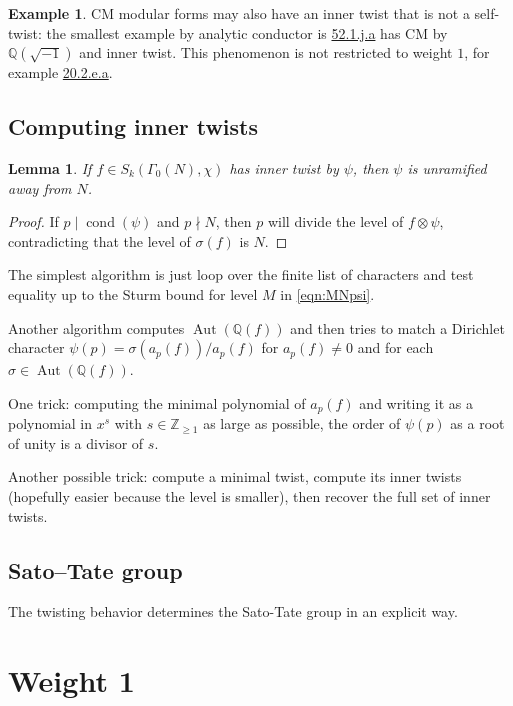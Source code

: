 \documentclass[11pt]{amsart}
\numberwithin{equation}{subsection}
\theoremstyle{plain}
\newtheorem{lem}[equation]{Lemma}
\theoremstyle{definition}
\newtheorem{exm}[equation]{Example}
\newcommand{\Q}{\mathbb{Q}}
\newcommand{\Z}{\mathbb{Z}}
\DeclareMathOperator{\Aut}{Aut}
\DeclareMathOperator{\cond}{cond}
\begin{document}
\begin{exm}
CM modular forms may also have an inner twist that is not a self-twist: the smallest example by analytic conductor is \href{http://cmfs.lmfdb.xyz/ModularForm/GL2/Q/holomorphic/52/1/j/a/}{\textsf{52.1.j.a}} has CM by $\Q(\sqrt{-1})$ and inner twist.  This phenomenon is not restricted to weight $1$, for example \href{http://cmfs.lmfdb.xyz/ModularForm/GL2/Q/holomorphic/20/2/e/a/}{\textsf{20.2.e.a}}.
\end{exm}

\subsection{Computing inner twists}

\begin{lem}
If $f \in S_k(\Gamma_0(N),\chi)$ has inner twist by $\psi$, then $\psi$ is unramified away from $N$.  
\end{lem}

\begin{proof}
If $p \mid \cond(\psi)$ and $p \nmid N$, then $p$ will divide the level of $f \otimes \psi$, contradicting that the level of $\sigma(f)$ is $N$. 
\end{proof}

The simplest algorithm is just loop over the finite list of characters and test equality up to the Sturm bound for level $M$ in \eqref{eqn:MNpsi}.  

Another algorithm computes $\Aut(\Q(f))$ and then tries to match a Dirichlet character $\psi(p)=\sigma(a_p(f))/a_p(f)$ for $a_p(f) \neq 0$ and for each $\sigma \in \Aut(\Q(f))$.  

One trick: computing the minimal polynomial of $a_p(f)$ and writing it as a polynomial in $x^s$ with $s \in \Z_{\geq 1}$ as large as possible, the order of $\psi(p)$ as a root of unity is a divisor of $s$.  

Another possible trick: compute a minimal twist, compute its inner twists (hopefully easier because the level is smaller), then recover the full set of inner twists.

\subsection{Sato--Tate group}

The twisting behavior determines the Sato-Tate group in an explicit way.  

\section{Weight 1}
\end{document}
